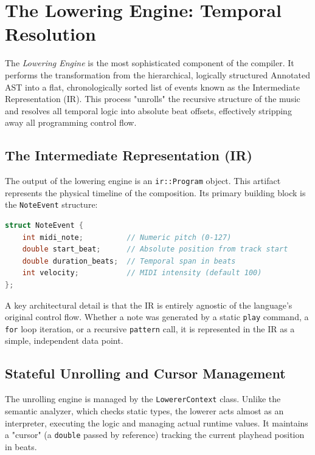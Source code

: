 \section{The Lowering Engine: Temporal Resolution}\label{sec:implementation-lowering}

The \textit{Lowering Engine} is the most sophisticated component of the compiler.
It performs the transformation from the hierarchical, logically structured Annotated AST into a flat, chronologically sorted list of events known as the Intermediate Representation (IR).
This process "unrolls" the recursive structure of the music and resolves all temporal logic into absolute beat offsets, effectively stripping away all programming control flow.

\subsection{The Intermediate Representation (IR)}

The output of the lowering engine is an \texttt{ir::Program} object.
This artifact represents the physical timeline of the composition.
Its primary building block is the \texttt{NoteEvent} structure:

\begin{lstlisting}[language=C++, caption={Structure of an atomic IR event.}]
struct NoteEvent {
    int midi_note;          // Numeric pitch (0-127)
    double start_beat;      // Absolute position from track start
    double duration_beats;  // Temporal span in beats
    int velocity;           // MIDI intensity (default 100)
};
\end{lstlisting}

A key architectural detail is that the IR is entirely agnostic of the language's original control flow.
Whether a note was generated by a static \texttt{play} command, a \texttt{for} loop iteration, or a recursive \texttt{pattern} call, it is represented in the IR as a simple, independent data point.

\subsection{Stateful Unrolling and Cursor Management}

The unrolling engine is managed by the \texttt{LowererContext} class.
Unlike the semantic analyzer, which checks static types, the lowerer acts almost as an interpreter, executing the logic and managing actual runtime values.
It maintains a "cursor" (a \texttt{double} passed by reference) tracking the current playhead position in beats.

